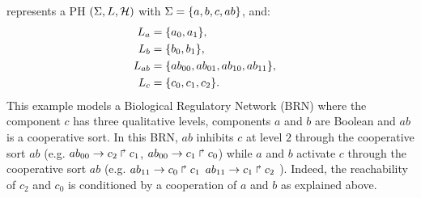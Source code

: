 \begin{example}
 represents a PH $(\Sigma,L,\mathcal{H})$ with $\Sigma = \{a,b,c,ab\}$, and:
\begin{align*}
L_a &= \{a_0,a_1\},\\
L_b &= \{b_0, b_1\},\\
L_{ab} &= \{ab_{00}, ab_{01}, ab_{10}, ab_{11}\},&\\
L_c &= \{c_0, c_1, c_2\}.
\end{align*}
This example models a Biological Regulatory Network (BRN) where the component $c$ has three qualitative levels, components $a$ and $b$ are Boolean and $ab$ is a cooperative sort.
In this BRN, $ab$ inhibits $c$ at level $2$ through the cooperative sort $ab$ (e.g. $ab_{00}\rightarrow c_2\Rsh c_1$, $ab_{00}\rightarrow c_1\Rsh c_0$) while $a$ and $b$ activate $c$  
through the cooperative sort $ab$ (e.g. $ab_{11}\rightarrow c_0\Rsh c_1$ $ab_{11}\rightarrow c_1\Rsh c_2$ ). Indeed, the reachability of $c_2$ and $c_0$ 
is conditioned by a cooperation of $a$ and $b$ as explained above.

\begin{figure}[H]
\begin{minipage}{0.1\linewidth}
\centering
{}
\end{minipage}
\hspace{2cm}
\begin{minipage}{0.7\linewidth}
\centering
{}
\end{minipage}
\end{figure}
\end{example}
